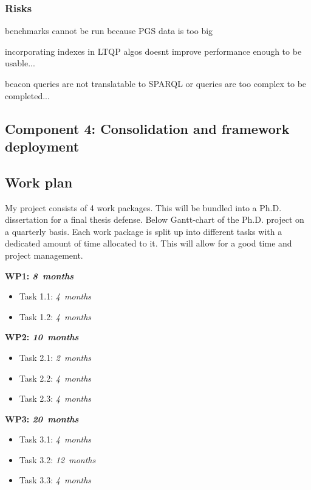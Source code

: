 \documentclass[a4paper,11pt]{article}
\begin{document}
\begin{refsection}
\subsubsection{Risks}

benchmarks cannot be run because PGS data is too big

incorporating indexes in LTQP algos doesnt improve performance enough to be usable...

beacon queries are not translatable to SPARQL or queries are too complex to be completed...

\newcommand\WPd{Consolidation and framework deployment}
\subsection{Component 4: \WPd}



\subsection{Work plan}
\smallskip

\noindent
My project consists of 4 work packages. 
This will be bundled into a Ph.D. dissertation for a final thesis defense.
Below Gantt-chart of the Ph.D. project on a quarterly basis.  
Each work package is split up into different tasks with a dedicated amount of time allocated to it. 
This will allow for a good time and project management. 

\begin{adjustwidth}{0cm}{0cm}
	\parindent 0pt
	\newcommand\duration[1]{\hfill\emph{#1~months}}
  
	\textbf{WP1:      \WPa  \duration{8}}
	\begin{itemize}
	  \item Task 1.1: \WPaa \duration{ 4}
	  \item Task 1.2: \WPab \duration{ 4}
	\end{itemize}
	\smallskip
  
	\textbf{WP2:      \WPb  \duration{10}}
	\begin{itemize}
	  \item Task 2.1: \WPba \duration{ 2}
	  \item Task 2.2: \WPbb \duration{ 4}
	  \item Task 2.3: \WPbc \duration{ 4}
	\end{itemize}
	\smallskip
	
	\textbf{WP3:      \WPc  \duration{20}}
	\begin{itemize}
	  \item Task 3.1: \WPca \duration{ 4}
	  \item Task 3.2: \WPcb \duration{ 12}
	  \item Task 3.3: \WPcc \duration{ 4}
	\end{itemize}
	\smallskip
	

\end{adjustwidth}
\end{refsection}
\end{document}
